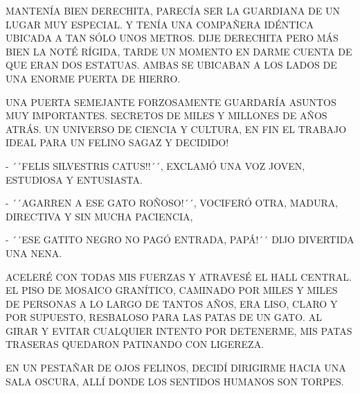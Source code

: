 MANTENÍA BIEN DERECHITA, PARECÍA SER LA GUARDIANA DE UN LUGAR MUY ESPECIAL. Y TENÍA UNA COMPAÑERA IDÉNTICA UBICADA A TAN SÓLO UNOS METROS. DIJE DERECHITA PERO MÁS BIEN LA NOTÉ RÍGIDA, TARDE UN MOMENTO EN DARME CUENTA DE QUE ERAN DOS ESTATUAS. AMBAS SE UBICABAN A LOS LADOS DE UNA ENORME PUERTA DE HIERRO.
\newpage
{}
\begin{minipage}[l]{.45\textwidth}\hspace{-2cm}
\end{minipage}
\begin{minipage}[r]{.45\textwidth}
UNA PUERTA SEMEJANTE FORZOSAMENTE GUARDARÍA ASUNTOS MUY IMPORTANTES. SECRETOS DE MILES Y MILLONES DE AÑOS ATRÁS. UN UNIVERSO DE CIENCIA Y CULTURA, EN FIN EL TRABAJO IDEAL PARA UN FELINO SAGAZ Y DECIDIDO!
\end{minipage}
 
\newpage
{}
-  ´´FELIS SILVESTRIS CATUS!!´´, EXCLAMÓ UNA VOZ JOVEN, ESTUDIOSA Y ENTUSIASTA.

-  ´´AGARREN A ESE GATO ROÑOSO!´´, VOCIFERÓ OTRA, MADURA, DIRECTIVA Y SIN MUCHA PACIENCIA, 

- ´´ESE GATITO NEGRO NO PAGÓ ENTRADA, PAPÁ!´´ DIJO DIVERTIDA UNA NENA.

ACELERÉ CON TODAS MIS FUERZAS Y ATRAVESÉ EL HALL CENTRAL. EL PISO DE MOSAICO GRANÍTICO, CAMINADO POR MILES Y MILES DE PERSONAS A LO LARGO DE TANTOS AÑOS, ERA LISO, CLARO Y POR SUPUESTO, RESBALOSO PARA LAS PATAS DE UN GATO. AL GIRAR Y EVITAR CUALQUIER INTENTO POR DETENERME, MIS PATAS TRASERAS QUEDARON PATINANDO CON LIGEREZA. 

EN UN PESTAÑAR DE OJOS FELINOS, DECIDÍ DIRIGIRME HACIA UNA SALA OSCURA, ALLÍ DONDE LOS SENTIDOS HUMANOS SON TORPES.
 
